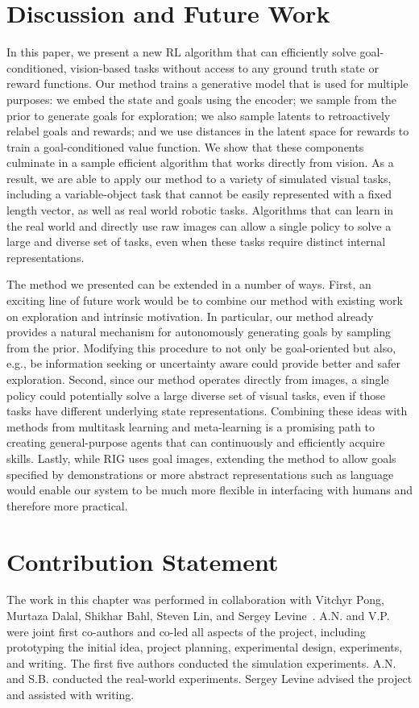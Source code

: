 \section{Discussion and Future Work}

In this paper, we present a new RL algorithm that can efficiently solve goal-conditioned, vision-based tasks without access to any ground truth state or reward functions.
Our method trains a generative model that is used for multiple purposes: we embed the state and goals using the encoder; we sample from the prior to generate goals for exploration; we also sample latents to retroactively relabel goals and rewards; and we use distances in the latent space for rewards to train a goal-conditioned value function.
We show that these components culminate in a sample efficient algorithm that works directly from vision.
As a result, we are able to apply our method to a variety of simulated visual tasks, including a variable-object task that cannot be easily represented with a fixed length vector, as well as real world robotic tasks.
Algorithms that can learn in the real world and directly use raw images can allow a single policy to solve a large and diverse set of tasks, even when these tasks require distinct internal representations.

The method we presented can be extended in a number of ways.
First, an exciting line of future work would be to combine our method with existing work on exploration and intrinsic motivation.
In particular, our method already provides a natural mechanism for autonomously generating goals by sampling from the prior.
Modifying this procedure to not only be goal-oriented but also, e.g., be information seeking or uncertainty aware could provide better and safer exploration.
Second, since our method operates directly from images, a single policy could potentially solve a large diverse set of visual tasks, even if those tasks have different underlying state representations.
Combining these ideas with methods from multitask learning and meta-learning is a promising path to creating general-purpose agents that can continuously and efficiently acquire skills.
Lastly, while RIG uses goal images, extending the method to allow goals specified by demonstrations or more abstract representations such as language would enable our system to be much more flexible in interfacing with humans and therefore more practical.

\section{Contribution Statement}

The work in this chapter was performed in collaboration with Vitchyr Pong, Murtaza Dalal, Shikhar Bahl, Steven Lin, and Sergey Levine~\citep{nair2018rig}. A.N. and V.P. were joint first co-authors and co-led all aspects of the project, including prototyping the initial idea, project planning, experimental design, experiments, and writing. The first five authors conducted the simulation experiments. A.N. and S.B. conducted the real-world experiments. Sergey Levine advised the project and assisted with writing.
